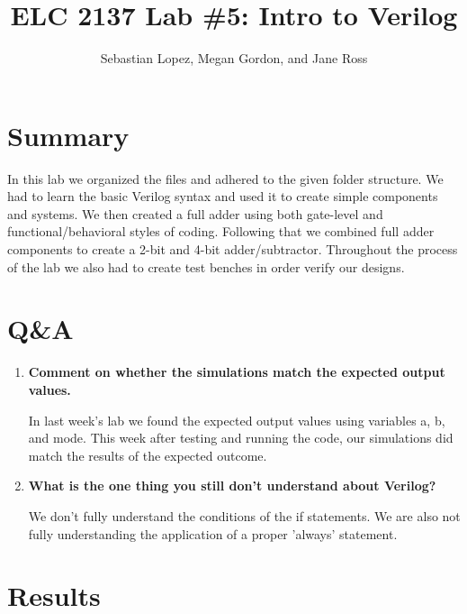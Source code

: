 \documentclass[11pt]{article}
\begin{document}
\title{ELC 2137 Lab \#5: Intro to Verilog }
\author{Sebastian Lopez, Megan Gordon, and Jane Ross }

\maketitle


\section*{Summary}

In this lab we organized the files and adhered to the given folder structure. We had to learn the basic Verilog syntax and used it to create simple components and systems. We then created a full adder using both gate-level and functional/behavioral styles of coding. Following that we combined full adder components to create a 2-bit and 4-bit adder/subtractor. Throughout the process of the lab we also had to create test benches in order verify our designs.  

\section*{Q\&A}


\begin{enumerate}
	\item \textbf{Comment on whether the simulations match the expected output values.} 
		
	In last week's lab we found the expected output values using variables a, b, and mode. This week after testing and running the code, our simulations did match the results of the expected outcome.  
	
	\item \textbf{What is the one thing you still don't understand about Verilog?}
	
	We don't fully understand the conditions of the if statements. We are also not fully understanding the application of a proper 'always' statement. 
	 
\end{enumerate}

\section*{Results}
\end{document}
